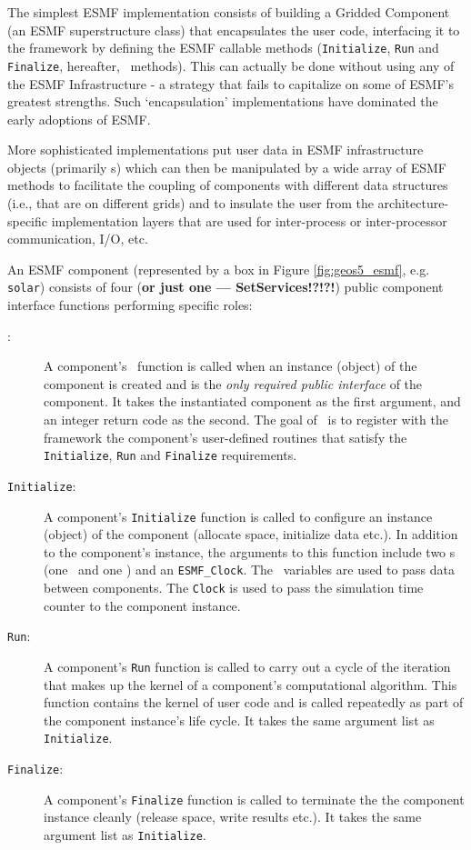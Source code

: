 The simplest ESMF implementation consists of building a Gridded
Component (an ESMF superstructure class) that encapsulates the user
code, interfacing it to the framework by defining the ESMF callable
methods (\texttt{Initialize}, \texttt{Run} and \texttt{Finalize},
hereafter, \IRF\ methods). This
can actually be done without using any of the ESMF Infrastructure - a
strategy that fails to capitalize on some of ESMF's greatest
strengths. Such `encapsulation' implementations have dominated the early
adoptions of ESMF.

More sophisticated implementations put user data in ESMF
infrastructure objects (primarily \fld s) which can then be
manipulated by a wide array of ESMF methods to facilitate the coupling
of components with different data structures (i.e., that are on
different grids) and to insulate the user
from the architecture-specific implementation layers that are used for
inter-process or inter-processor communication, I/O, etc.

An ESMF component (represented by a box in Figure \ref{fig:geos5_esmf},
e.g. \texttt{solar}) consists of four (\textbf{or just one --- SetServices!?!?!}) public component interface functions
performing specific roles:
\begin{description}
\item[\ssv:] A component's \ssv\ function is called when an
instance (object) of the component is created and is the \emph{only required
public interface} of the component. It takes the instantiated component as
the first argument, and an integer return code as the second. The goal of
\ssv\ is to register with the framework the component's user-defined routines
that satisfy the \texttt{Initialize}, \texttt{Run} and \texttt{Finalize}
requirements.
\item[\texttt{Initialize}:] A component's \texttt{Initialize} function
is called to configure an instance (object) of the component (allocate
space, initialize data etc.). In addition to
the component's instance, the arguments to this function include two
\stt s (one \im\ and one \ex) and an \texttt{ESMF\_Clock}. The \stt\
variables are used to pass data between components. The
\texttt{Clock} is used to pass the simulation time counter to the component
instance.
\item[\texttt{Run}:] A component's \texttt{Run} function is called to
carry out a cycle of the iteration that makes up the kernel of a component's
computational algorithm. This function contains the kernel of user code
and is called repeatedly as part of the
component instance's life cycle. It takes the same argument list as
\texttt{Initialize}.
\item[\texttt{Finalize}:] A component's \texttt{Finalize} function is
called to terminate the the component instance cleanly (release space,
write results etc.). It takes the same argument list as \texttt{Initialize}.
\end{description}

